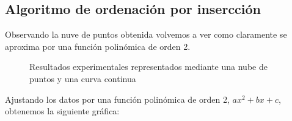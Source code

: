 \documentclass{article}
\begin{document}
\subsection{Algoritmo de ordenación por insercción}

Observando la nuve de puntos obtenida volvemos a ver como claramente
se aproxima por una función polinómica de orden 2.

\begin{figure}[H]%
    \centering
    \qquad
    \caption{Resultados experimentales representados mediante una nube de puntos y una curva continua}%
    \label{fig:example}%
  \end{figure}

Ajustando los datos por una función polinómica de orden 2, $ax^2+bx + c$, obtenemos la siguiente gráfica:
\end{document}
